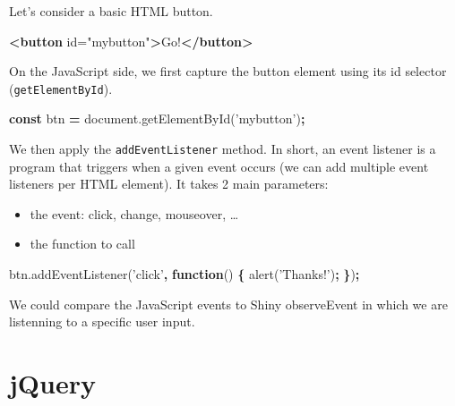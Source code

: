 \documentclass[]{book}
\newenvironment{Shaded}{\begin{snugshade}}{\end{snugshade}}
\newcommand{\AttributeTok}[1]{\textcolor[rgb]{0.77,0.63,0.00}{#1}}
\newcommand{\KeywordTok}[1]{\textcolor[rgb]{0.13,0.29,0.53}{\textbf{#1}}}
\newcommand{\NormalTok}[1]{#1}
\newcommand{\OperatorTok}[1]{\textcolor[rgb]{0.81,0.36,0.00}{\textbf{#1}}}
\newcommand{\OtherTok}[1]{\textcolor[rgb]{0.56,0.35,0.01}{#1}}
\newcommand{\StringTok}[1]{\textcolor[rgb]{0.31,0.60,0.02}{#1}}
\newcommand{\VariableTok}[1]{\textcolor[rgb]{0.00,0.00,0.00}{#1}}
\providecommand{\tightlist}{%
  \setlength{\itemsep}{0pt}\setlength{\parskip}{0pt}}
\begin{document}
Let's consider a basic HTML button.

\begin{Shaded}
\begin{Highlighting}[]
\KeywordTok{<button}\OtherTok{ id=}\StringTok{"mybutton"}\KeywordTok{>}\NormalTok{Go!}\KeywordTok{</button>}
\end{Highlighting}
\end{Shaded}

On the JavaScript side, we first capture the button element using its id selector (\texttt{getElementById}).

\begin{Shaded}
\begin{Highlighting}[]
\KeywordTok{const}\NormalTok{ btn }\OperatorTok{=} \VariableTok{document}\NormalTok{.}\AttributeTok{getElementById}\NormalTok{(}\StringTok{'mybutton'}\NormalTok{)}\OperatorTok{;}
\end{Highlighting}
\end{Shaded}

We then apply the \texttt{addEventListener} method. In short, an event listener is a program that triggers when a given event occurs (we can add multiple event listeners per HTML element). It takes 2 main parameters:

\begin{itemize}
\tightlist
\item
  the event: click, change, mouseover, \ldots{}
\item
  the function to call
\end{itemize}

\begin{Shaded}
\begin{Highlighting}[]
\VariableTok{btn}\NormalTok{.}\AttributeTok{addEventListener}\NormalTok{(}\StringTok{'click'}\OperatorTok{,} \KeywordTok{function}\NormalTok{() }\OperatorTok{\{}
  \AttributeTok{alert}\NormalTok{(}\StringTok{'Thanks!'}\NormalTok{)}\OperatorTok{;}
\OperatorTok{\}}\NormalTok{)}\OperatorTok{;}
\end{Highlighting}
\end{Shaded}

We could compare the JavaScript events to Shiny observeEvent in which we are listenning to a specific user input.

\hypertarget{jquery}{%
\section{jQuery}\label{jquery}}
\end{document}
